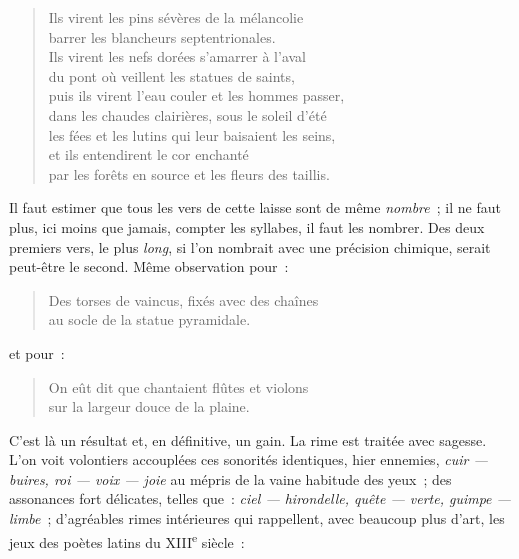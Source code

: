 \documentclass[french,twoside]{book} %
\begin{document}
\begin{verse}
Ils virent les pins sévères de la mélancolie\\
barrer les blancheurs septentrionales.\\
Ils virent les nefs dorées s’amarrer à l’aval\\
du pont où veillent les statues de saints,\\
puis ils virent l’eau couler et les hommes passer,\\
dans les chaudes clairières, sous le soleil d’été\\
les fées et les lutins qui leur baisaient les seins,\\
et ils entendirent le cor enchanté\\
par les forêts en source et les fleurs des taillis.\\
\end{verse}

\noindent Il faut estimer que tous les vers de cette laisse sont de même {\itshape nombre} ; il ne faut plus, ici moins que jamais, compter les syllabes, il faut les nombrer. Des deux premiers vers, le plus {\itshape long}, si l’on nombrait avec une précision chimique, serait peut-être le second. Même observation pour :\par


\begin{verse}
Des torses de vaincus, fixés avec des chaînes\\
au socle de la statue pyramidale.\\
\end{verse}

\noindent et pour :\par


\begin{verse}
On eût dit que chantaient flûtes et violons\\
sur la largeur douce de la plaine.\\
\end{verse}

\noindent C’est là un résultat et, en définitive, un gain. La rime est traitée avec sagesse. L’on voit volontiers accouplées ces sonorités identiques, hier ennemies, {\itshape cuir — buires, roi — voix — joie} au mépris de la vaine habitude des yeux ; des assonances fort délicates, telles que : {\itshape ciel — hirondelle, quête — verte, guimpe — limbe} ; d’agréables rimes intérieures qui rappellent, avec beaucoup plus d’art, les jeux des poètes latins du XIII\textsuperscript{e} siècle :\par
\end{document}
